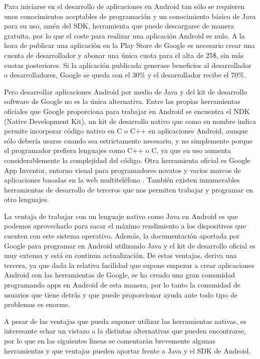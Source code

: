 \documentclass[
10pt, %
a4paper, %
oneside, %
headinclude,footinclude, %
BCOR5mm, %
]{scrartcl}
\begin{document}
Para iniciarse en el desarrollo de aplicaciones en Android tan sólo se requieren unos conocimientos aceptables de programación y un conocimiento básico de Java para su uso, amén del SDK, herramienta que puede descargarse de manera gratuita, por lo que el coste para realizar una aplicación Android es nulo. A la hora de publicar una aplicación en la Play Store de Google es necesario crear una cuenta de desarrollador y abonar una única cuota para el alta de 25\$, sin más cuotas posteriores. Si la aplicación publicada generase beneficios al desarrollador o desarrolladores, Google se queda con el 30\% y el desarrollador recibe el 70\%.

Pero desarrollar aplicaciones Android por medio de Java y del kit de desarrollo software de Google no es la única alternativa. Entre las propias herramientas oficiales que Google proporciona para trabajar en Android se encuentra el NDK (Native Development Kit), un kit de desarrollo nativo que como su nombre indica permite incorporar código nativo en C o C++ en aplicaciones Android, aunque sólo debería usarse cuando sea estrictamente necesario, y no simplemente porque el programador prefiera lenguajes como C++ o C, ya que su uso aumenta considerablemente la complejidad del código. Otra herramienta oficial es Google App Inventor, entorno visual para programadores novatos y varios marcos de aplicaciones basadas en la web multiteléfono . También existen innumerables herramientas de desarrollo de terceros que nos permiten trabajar y programar en otro lenguajes.

La ventaja de trabajar con un lenguaje nativo como Java en Android es que podemos aprovecharlo para sacar el máximo rendimiento a los dispositivos que cuenten con este sistema operativo. Además, la documentación aportada por Google para programar en Android utilizando Java y el kit de desarrollo oficial es muy extensa y está en continua actualización. De estas ventajas, deriva una tercera, ya que dada la relativa facilidad que supone empezar a crear aplicaciones Android con las herramientas de Google, se ha creado una gran comunidad programando apps en Android de esta manera, por lo tanto la comunidad de usuarios que tiene detrás y que puede proporcionar ayuda ante todo tipo de problemas es enorme.

A pesar de las ventajas que pueda suponer utilizar las herramientas nativas, es interesante echar un vistazo a la distintas alternativas que pueden encontrarse, por lo que en las siguientes lineas se comentarán brevemente algunas herramientas y que ventajas pueden aportar frente a Java y el SDK de Android.
\end{document}
